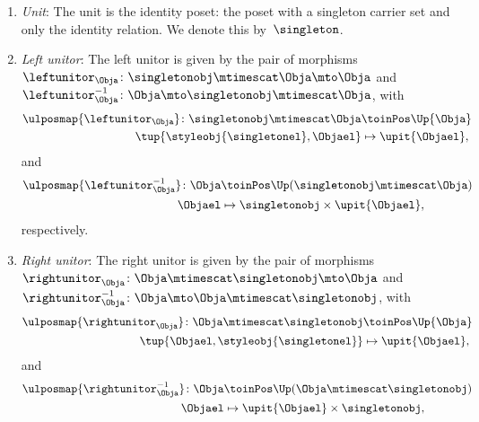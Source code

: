 \begin{lemma}
\begin{enumerate}
    \item \emph{Unit}: The unit is the identity poset: the poset with a singleton carrier set and only the identity relation.
    We denote this by~$\singleton$.
    \item \emph{Left unitor}: The left unitor is given by the pair of morphisms~$\leftunitor_\Obja\colon \singletonobj\mtimescat \Obja \mto \Obja$ and~$\leftunitor_\Obja^{-1}\colon \Obja \mto \singletonobj\mtimescat \Obja$, with
    \begin{equation}
        \begin{aligned}
            \ulposmap{\leftunitor_\Obja}\colon \singletonobj\mtimescat \Obja &\toinPos \Up{\Obja}\\
            \tup{\styleobj{\singletonel},\Objael}&\mapsto \upit\{\Objael\},
        \end{aligned}
    \end{equation}
    and
    \begin{equation}
        \begin{aligned}
            \ulposmap{\leftunitor_\Obja^{-1}}\colon \Obja &\toinPos \Up(\singletonobj\mtimescat \Obja) \\
            \Objael&\mapsto \singletonobj \times \upit \{\Objael\},
        \end{aligned}
    \end{equation}
    respectively.
    \item \emph{Right unitor}: The right unitor is given by the pair of morphisms~$\rightunitor_\Obja\colon \Obja\mtimescat \singletonobj  \mto \Obja$ and~$\rightunitor_\Obja^{-1}\colon \Obja \mto \Obja \mtimescat \singletonobj$, with
    \begin{equation}
        \begin{aligned}
            \ulposmap{\rightunitor_\Obja}\colon \Obja\mtimescat \singletonobj  &\toinPos \Up{\Obja}\\
            \tup{\Objael,\styleobj{\singletonel}}&\mapsto \upit\{\Objael\},
        \end{aligned}
    \end{equation}
    and
    \begin{equation}
        \begin{aligned}
            \ulposmap{\rightunitor_\Obja^{-1}}\colon \Obja &\toinPos \Up( \Obja \mtimescat \singletonobj) \\
            \Objael&\mapsto \upit \{\Objael\} \times \singletonobj,
        \end{aligned}
    \end{equation}

\end{enumerate}
\end{lemma}

